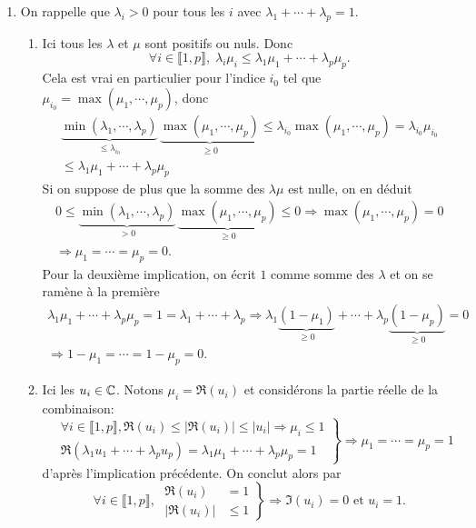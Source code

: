 \begin{enumerate}
  \item On rappelle que $\lambda_i > 0$ pour tous les $i$ avec $\lambda_1 + \cdots + \lambda_p = 1$.
\begin{enumerate}
 \item \label{impfond} Ici tous les $\lambda$ et $\mu$ sont positifs ou nuls. Donc 
\[
  \forall i \in \llbracket 1,p \rrbracket, \; \lambda_i \mu_i \leq \lambda_1 \mu_1 + \cdots + \lambda_p \mu_p.
\]
Cela est vrai en particulier pour l'indice $i_0$ tel que $\mu_{i_0} = \max(\mu_1, \cdots, \mu_p)$, donc
\begin{multline*}
 \underset{\leq \lambda_{i_0}}{\underbrace{\min(\lambda_1, \cdots, \lambda_p)}} \,\underset{\geq 0}{\underbrace{\max(\mu_1, \cdots, \mu_p)}} \leq \lambda_{i_0} \max(\mu_1, \cdots, \mu_p)
 =  \lambda_{i_0} \mu_{i_0} \\
 \leq \lambda_1 \mu_1 + \cdots + \lambda_p \mu_p
\end{multline*}
Si on suppose de plus que la somme des $\lambda \mu$ est nulle, on en déduit
\begin{multline*}
  0 \leq 
  \underset{>0}{\underbrace{\min(\lambda_1, \cdots, \lambda_p)}} \,\underset{\geq 0}{\underbrace{\max(\mu_1, \cdots, \mu_p)}}
  \leq 0
  \Rightarrow \max(\mu_1, \cdots, \mu_p) = 0 \\
  \Rightarrow \mu_1 = \cdots = \mu_p = 0.
\end{multline*}
Pour la deuxième implication, on écrit $1$ comme somme des $\lambda$ et on se ramène à la première
\begin{multline*}
  \lambda_1 \mu_1 + \cdots + \lambda_p \mu_p = 1 = \lambda_1 + \cdots + \lambda_p
  \Rightarrow \lambda_1 \underset{\geq 0}{\underbrace{(1-\mu_1)}} + \cdots + \lambda_p \underset{\geq 0}{\underbrace{(1-\mu_p)}} = 0 \\
  \Rightarrow 1- \mu_1 = \cdots = 1- \mu_p = 0.
\end{multline*}

  \item \label{impcomp} Ici les $u_i\in \mathbb{C}$. Notons $\mu_i= \Re(u_i)$ et considérons la partie réelle de la combinaison:
\[
  \left.
  \begin{aligned}
    &\forall i \in \llbracket 1,p \rrbracket,  \Re(u_i) \leq \left|\Re(u_i)\right| \leq |u_i|\Rightarrow \mu_i \leq 1 \\
    & \Re\left( \lambda_1 u_1 + \cdots + \lambda_p u_p\right) = \lambda_1 \mu_1 +  \cdots + \lambda_p \mu_p = 1
  \end{aligned}
  \right\rbrace \Rightarrow
  \mu_1 = \cdots = \mu_p = 1
\]
 d'après l'implication précédente. On conclut alors par  
\[
  \forall i \in \llbracket 1,p \rrbracket,\;
  \left.
  \begin{aligned}
    \Re(u_i) &= 1 \\ \left| \Re(u_i)\right| &\leq 1
  \end{aligned}
  \right\rbrace \Rightarrow
  \Im(u_i) = 0 \text{ et } u_i = 1.
\]
    \end{enumerate}
\end{enumerate}

